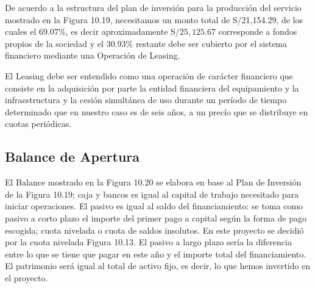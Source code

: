 De acuerdo a la estructura del plan de inversión para la producción del servicio mostrado en la Figura 10.19, necesitamos un monto total de S/21,154.29, de los cuales el 69.07\%, es decir aproximadamente $\mathrm{S} / 25,125.67$ corresponde a fondos propios de la sociedad y el $30.93 \%$ restante debe ser cubierto por el sistema financiero mediante una Operación de Leasing.

El Leasing debe ser entendido como una operación de carácter financiero que consiste en la adquisición por parte la entidad financiera del equipamiento y la infraestructura y la cesión simultánea de uso durante un período de tiempo determinado que en nuestro caso es de seis años, a un precío que se distribuye en cuotas periódicas.
\subsection{Balance de Apertura}

El Balance mostrado en la Figura 10.20 se elabora en base al Plan de Inversión de la Figura 10.19; caja y bancos es igual al capital de trabajo necesitado para iniciar operaciones. El pasivo es igual al saldo del financiamiento: se toma como pasivo a corto plazo el importe del primer pago a capital según la forma de pago escogida; cuota nivelada o cuota de saldos insolutos. En este proyecto se decidió por la cuota nivelada Figura 10.13. El pasivo a largo plazo sería la diferencia entre lo que se tiene que pagar en este año y el importe total del financiamiento. El patrimonio será igual al total de activo fijo, es decir, lo que hemos invertido en el proyecto.
